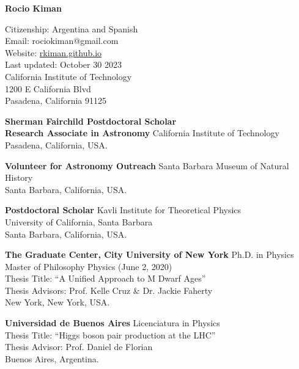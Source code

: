 \documentclass[10pt]{cv}
\newcommand{\firstpagestyle}{empty} %
\begin{document}
\thispagestyle{\firstpagestyle} 
\begin{center}
{\LARGE \textbf{\sc Rocio Kiman}}\\
\bigskip
\bigskip
\end{center}
\normalsize
  
\addresses
{
Citizenship: Argentina and Spanish\\
Email: rociokiman@gmail.com\\
Website: \href{https://rkiman.github.io}{rkiman.github.io}\\
Last updated: October 30 2023\\
}
{
California Institute of Technology\\
1200 E California Blvd\\
Pasadena, California 91125
}

\begin{llist}


\textbf{Sherman Fairchild Postdoctoral Scholar\\Research Associate in Astronomy}
California Institute of Technology \\
Pasadena, California, USA.

\textbf{Volunteer for Astronomy Outreach}
Santa Barbara Museum of Natural History \\
Santa Barbara, California, USA.


\textbf{Postdoctoral Scholar}
Kavli Institute for Theoretical Physics \\
University of California, Santa Barbara \\
Santa Barbara, California, USA.


\textbf{The Graduate Center, City University of New York}
Ph.D. in Physics\\
Master of Philosophy Physics (June 2, 2020)\\
Thesis Title: ``A Unified Approach to M Dwarf Ages''\\
Thesis Advisors: Prof. Kelle Cruz \& Dr. Jackie Faherty \\
New York, New York, USA.

\textbf{Universidad de Buenos Aires}
Licenciatura in Physics\\
Thesis Title: ``Higgs boson pair production at the LHC''\\
Thesis Advisor: Prof. Daniel de Florian\\
Buenos Aires, Argentina.




\end{llist}
\end{document}
